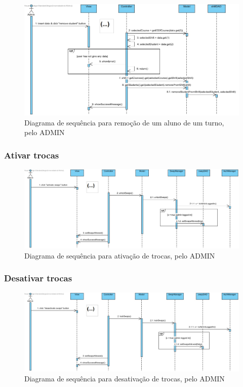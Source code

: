 \documentclass[a4paper]{article}
\begin{document}
\begin{figure}[H]
\centering
\includegraphics[width=14cm]{SEQRemoverAlunoTurno(peloAdmin)}
\caption{Diagrama de sequência para remoção de um aluno de um turno, pelo ADMIN}
\label{}
\end{figure}

\subsubsection{Ativar trocas}

\begin{figure}[H]
\centering
\includegraphics[width=14cm]{SEQAtivarTrocas}
\caption{Diagrama de sequência para ativação de trocas, pelo ADMIN}
\label{}
\end{figure}

\subsubsection{Desativar trocas}

\begin{figure}[H]
\centering
\includegraphics[width=14cm]{SEQDesativarTrocas}
\caption{Diagrama de sequência para desativação de trocas, pelo ADMIN}
\label{}
\end{figure}
\end{document}
